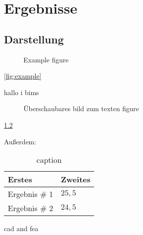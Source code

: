 
\chapter{Ergebnisse}

\section{Darstellung}
\begin{figure}[ht]
  \centering
  \caption{Example figure}
  \label{fig:example3} %
\end{figure}

\cref{fig:example}

hallo i bims

\begin{figure}[ht]
  \centering
  \caption{Überschaubares bild zum texten figure}
  \label{fig:example4} %
\end{figure}

\cref{fig:example4}

Außerdem:
\begin{table}[H]
  \centering
  \begin{tabular}{ll}
    \toprule
     Erstes & Zweites  \\
    \midrule
    Ergebnis \# 1 & $25,5$ \\
    Ergebnis \# 2 & $24,5$ \\
    \bottomrule
  \end{tabular} 
\caption{caption} \label{tab:test1}
\end{table}

\ac{cad}
and \ac{fea}